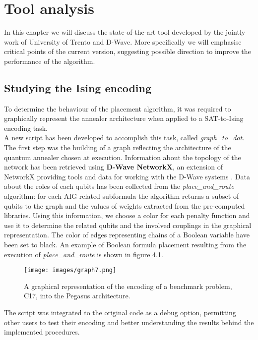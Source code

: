 \chapter{Tool analysis}
\label{cha:analysis}

In this chapter we will discuss the state-of-the-art tool developed by the jointly work of University of Trento and D-Wave. More specifically we will emphasise critical points of the current version, suggesting possible direction to improve the performance of the algorithm.

\section{Studying the Ising encoding}

To determine the behaviour of the placement algorithm, it was required to graphically represent the annealer architecture when applied to a SAT-to-Ising encoding task. \\
A new script has been developed to accomplish this task, called \textit{graph\_to\_dot}. The first step was the building of a graph reflecting the architecture of the quantum annealer chosen at execution. Information about the topology of the network has been retrieved using \textbf{D-Wave NetworkX}, an extension of NetworkX providing tools and data for working with the D-Wave systems \cite{dwavenetx}. Data about the roles of each qubits has been collected from the \textit{place\_and\_route} algorithm: for each AIG-related subformula the algorithm returns a subset of qubits to the graph and the values of weights extracted from the pre-computed libraries. Using this information, we choose a color for each penalty function and use it to determine the related qubits and the involved couplings in the graphical representation. The color of edges representing chains of a Boolean variable have been set to black. 
An example of Boolean formula placement resulting from the execution of \textit{place\_and\_route} is shown in figure 4.1.

\begin{figure}[]
	\begin{center}
	\texttt{[image: images/graph7.png]}
	\caption{A graphical representation of the encoding of a benchmark problem, C17, into the Pegasus architecture.}
	\end{center}
\end{figure}

The script was integrated to the original code as a debug option, permitting other users to test their encoding and better understanding the results behind the implemented procedures.

